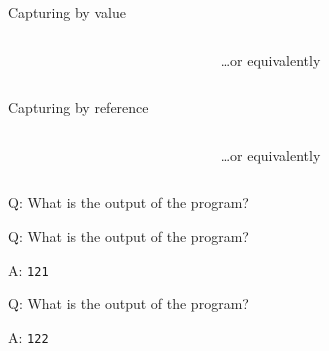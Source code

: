 \begin{frame}[fragile]{Capturing by value}
    \begin{columns}[t]
        \begin{column}{.45\textwidth}
        \end{column}
        \begin{column}{.45\textwidth}
            \ldots or equivalently
        \end{column}
    \end{columns}
\end{frame}

\begin{frame}[fragile]{Capturing by reference}
    \begin{columns}[t]
        \begin{column}{.45\textwidth}
        \end{column}
        \begin{column}{.45\textwidth}
            \ldots or equivalently
        \end{column}
    \end{columns}
\end{frame}

\begin{frame}[fragile]{Q: What is the output of the program?}

\end{frame}

\begin{frame}[fragile]{Q: What is the output of the program?}
\end{frame}

\begin{frame}[fragile]{A: \texttt{121}}
\end{frame}

\begin{frame}[fragile]{Q: What is the output of the program?}
\end{frame}

\begin{frame}[fragile]{A: \texttt{122}}
\end{frame}

